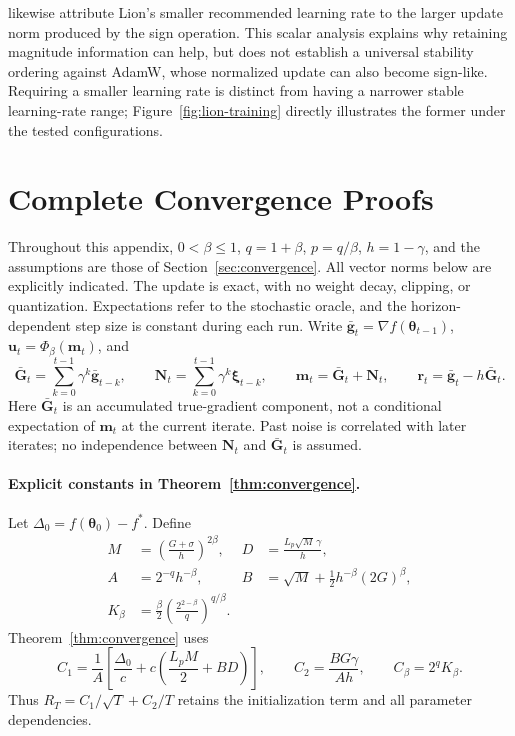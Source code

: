 \documentclass{article}
\begin{document}
\citet{chen2024symbolic} likewise attribute Lion's smaller recommended learning rate to the larger update norm produced by the sign operation. This scalar analysis explains why retaining magnitude information can help, but does not establish a universal stability ordering against AdamW, whose normalized update can also become sign-like. Requiring a smaller learning rate is distinct from having a narrower stable learning-rate range; Figure~\ref{fig:lion-training} directly illustrates the former under the tested configurations.

\FloatBarrier
\section{Complete Convergence Proofs}
\label{app:proofs}
Throughout this appendix, $0<\beta\le1$, $q=1+\beta$, $p=q/\beta$, $h=1-\gamma$, and the assumptions are those of Section~\ref{sec:convergence}. All vector norms below are explicitly indicated. The update is exact, with no weight decay, clipping, or quantization. Expectations refer to the stochastic oracle, and the horizon-dependent step size is constant during each run. Write $\bar{\mathbf{g}}_t=\nabla f(\bm{\theta}_{t-1})$, $\mathbf{u}_t=\Phi_\beta(\mathbf{m}_t)$, and
\begin{equation}\label{eq:buffer-decomp}
\bar{\mathbf{G}}_t=\sum_{k=0}^{t-1}\gamma^k\bar{\mathbf{g}}_{t-k},\qquad
\mathbf{N}_t=\sum_{k=0}^{t-1}\gamma^k\bm{\xi}_{t-k},\qquad
\mathbf{m}_t=\bar{\mathbf{G}}_t+\mathbf{N}_t,\qquad \mathbf{r}_t=\bar{\mathbf{g}}_t-h\bar{\mathbf{G}}_t.
\end{equation}
Here $\bar{\mathbf{G}}_t$ is an accumulated true-gradient component, not a conditional expectation of $\mathbf{m}_t$ at the current iterate. Past noise is correlated with later iterates; no independence between $\mathbf{N}_t$ and $\bar{\mathbf{G}}_t$ is assumed.

\paragraph{Explicit constants in Theorem~\ref{thm:convergence}.}
Let $\Delta_0=f(\bm{\theta}_0)-f^*$. Define
\begin{align}
M&=\left(\frac{G+\sigma}{h}\right)^{2\beta},
&D&=\frac{L_p\sqrt M\,\gamma}{h},\nonumber\\
A&=2^{-q}h^{-\beta},
&B&=\sqrt M+\tfrac12h^{-\beta}(2G)^\beta,\label{eq:theory-constants}\\
K_\beta&=\frac{\beta}{2}\left(\frac{2^{2-\beta}}q\right)^{q/\beta}.\nonumber
\end{align}
Theorem~\ref{thm:convergence} uses
\begin{equation}
C_1=\frac1A\left[\frac{\Delta_0}{c}+c\left(\frac{L_pM}{2}+BD\right)\right],\qquad
C_2=\frac{BG\gamma}{Ah},\qquad C_\beta=2^qK_\beta.
\end{equation}
Thus $R_T=C_1/\sqrt T+C_2/T$ retains the initialization term and all parameter dependencies.
\end{document}
